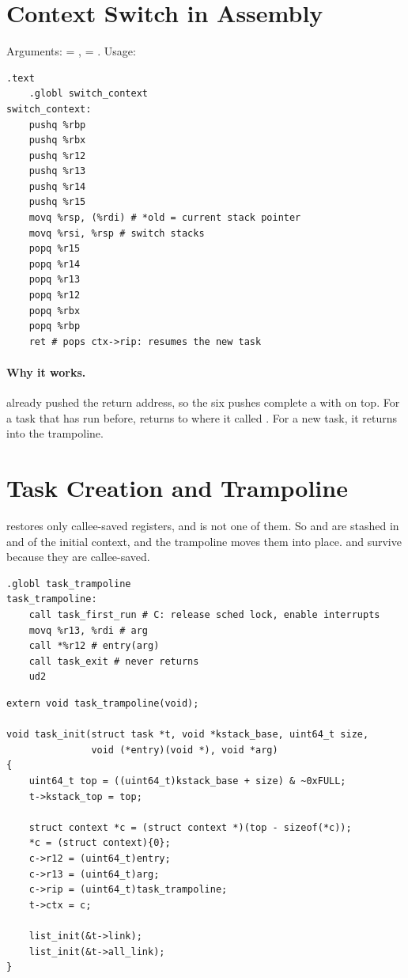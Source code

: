 \section{Context Switch in Assembly}
Arguments:  = ,
 = . Usage:

\begin{lstlisting}[style=asmstyle]
    .text
    .globl switch_context
switch_context:
    pushq %rbp
    pushq %rbx
    pushq %r12
    pushq %r13
    pushq %r14
    pushq %r15
    movq %rsp, (%rdi) # *old = current stack pointer
    movq %rsi, %rsp # switch stacks
    popq %r15
    popq %r14
    popq %r13
    popq %r12
    popq %rbx
    popq %rbp
    ret # pops ctx->rip: resumes the new task
\end{lstlisting}

\paragraph{Why it works.}  already pushed the return address,
so the six pushes complete a  with  on top.
For a task that has run before,  returns to where it called
. For a new task, it returns into the trampoline.

\section{Task Creation and Trampoline}
 restores only callee-saved registers, and
 is not one of them. So  and  are stashed
in  and  of the initial context, and the trampoline
moves them into place.  and  survive
 because they are callee-saved.

\begin{lstlisting}[style=asmstyle]
    .globl task_trampoline
task_trampoline:
    call task_first_run # C: release sched lock, enable interrupts
    movq %r13, %rdi # arg
    call *%r12 # entry(arg)
    call task_exit # never returns
    ud2
\end{lstlisting}

\begin{lstlisting}[style=cstyle]
extern void task_trampoline(void);

void task_init(struct task *t, void *kstack_base, uint64_t size,
               void (*entry)(void *), void *arg)
{
    uint64_t top = ((uint64_t)kstack_base + size) & ~0xFULL;
    t->kstack_top = top;

    struct context *c = (struct context *)(top - sizeof(*c));
    *c = (struct context){0};
    c->r12 = (uint64_t)entry;
    c->r13 = (uint64_t)arg;
    c->rip = (uint64_t)task_trampoline;
    t->ctx = c;

    list_init(&t->link);
    list_init(&t->all_link);
}
\end{lstlisting}

